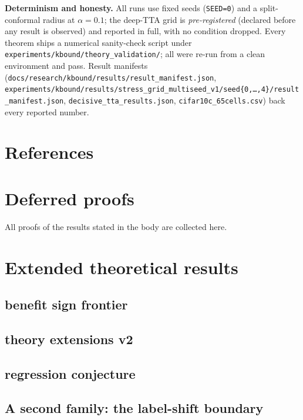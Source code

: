 \documentclass[11pt]{article}
\theoremstyle{plain}
\theoremstyle{definition}
\begin{document}
\noindent\textbf{Determinism and honesty.} All runs use fixed seeds (\texttt{SEED=0}) and a
split-conformal radius at $\alpha=0.1$; the deep-TTA grid is \emph{pre-registered} (declared
before any result is observed) and reported in full, with no condition dropped. Every theorem
ships a numerical sanity-check script under \texttt{experiments/kbound/theory\_validation/}; all
were re-run from a clean environment and pass. Result manifests
(\texttt{docs/research/kbound/results/result\_manifest.json},
\texttt{experiments/kbound/results/stress\_grid\_multiseed\_v1/seed\{0,\dots,4\}/result\_manifest.json},
\texttt{decisive\_tta\_results.json}, \texttt{cifar10c\_65cells.csv}) back every reported number.

\section*{References}
\small


\appendix
\section{Deferred proofs}\label{app:proofs}
All proofs of the results stated in the body are collected here.


\section{Extended theoretical results}\label{app:ext}
\subsection{benefit sign frontier}


\subsection{theory extensions v2}


\subsection{regression conjecture}


\subsection{A second family: the label-shift boundary}\label{sec:lsslice}

\end{document}
